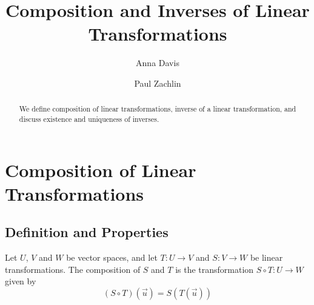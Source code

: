 \documentclass{ximera}
\author{Anna Davis \and Paul Zachlin} \title{Composition and Inverses of Linear Transformations} \license{CC-BY 4.0}
\begin{document}
\begin{abstract}
  We define composition of linear transformations, inverse of a linear transformation, and discuss existence and uniqueness of inverses.
\end{abstract}
\maketitle





\section*{Composition of Linear Transformations}

\subsection*{Definition and Properties}
\begin{definition} Let $U$, $V$ and $W$ be vector spaces, and let $T:U\rightarrow V$ and $S:V\rightarrow W$ be linear transformations.  The composition of $S$ and $T$ is the transformation $S\circ T:U\rightarrow W$ given by
$$(S\circ T)(\vec{u})=S(T(\vec{u}))$$
\end{definition}
\end{document}
